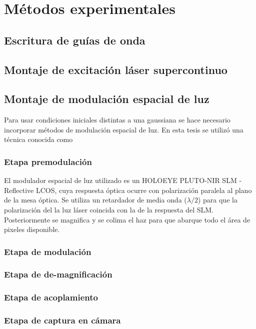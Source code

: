 \chapter{Métodos experimentales}

\section{Escritura de guías de onda}

\section{Montaje de excitación láser supercontinuo}

\newpage
\section{Montaje de modulación espacial de luz}

Para usar condiciones iniciales distintas a una gaussiana se hace necesario incorporar métodos de modulación espacial de luz. En esta tesis se utilizó una técnica conocida como 

\subsection{Etapa premodulación}
	El modulador espacial de luz utilizado es un HOLOEYE PLUTO-NIR SLM -  Reflective LCOS, cuya respuesta óptica ocurre con polarización paralela al plano de la mesa óptica. Se utiliza un retardador de media onda ($\lambda/2$) para que la polarización del la luz láser coincida con la de la respuesta del SLM. Posteriormente se magnifica y se colima el haz para que abarque todo el área de pixeles disponible.
\subsection{Etapa de modulación}

\subsection{Etapa de de-magnificación}
\subsection{Etapa de acoplamiento}
\subsection{Etapa de captura en cámara}

